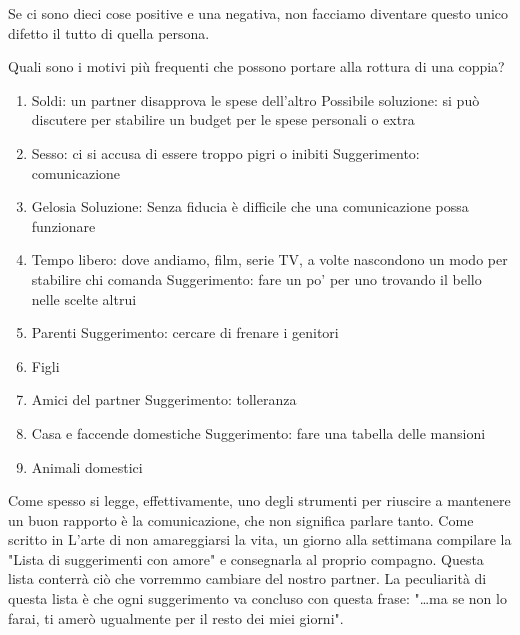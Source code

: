 \documentclass[12pt]{book} %
\begin{document}
Se ci sono dieci cose positive e una negativa, non facciamo diventare questo unico difetto il tutto di quella persona.

Quali sono i motivi più frequenti che possono portare alla rottura di una coppia?

\begin{enumerate}
\item Soldi: un partner disapprova le spese dell'altro\newline
Possibile soluzione: si può discutere per stabilire un budget per le spese personali o extra
\item Sesso: ci si accusa di essere troppo pigri o inibiti \newline
Suggerimento: comunicazione
\item Gelosia\newline
Soluzione: Senza fiducia è difficile che una comunicazione possa funzionare
\item Tempo libero: dove andiamo, film, serie TV, a volte nascondono un modo per stabilire chi comanda \newline
Suggerimento: fare un po' per uno trovando il bello nelle scelte altrui
\item Parenti \newline
Suggerimento: cercare di frenare i genitori
\item Figli
\item Amici del partner \newline
Suggerimento: tolleranza
\item Casa e faccende domestiche \newline
Suggerimento: fare una tabella delle mansioni
\item Animali domestici
\end{enumerate}
Come spesso si legge, effettivamente, uno degli strumenti per riuscire a mantenere un buon rapporto è la comunicazione,
che non significa parlare tanto. Come scritto in L'arte di non amareggiarsi la
vita, un giorno alla settimana compilare la "Lista
di suggerimenti con amore" e consegnarla al proprio compagno. Questa lista conterrà ciò che vorremmo cambiare del nostro partner. La peculiarità di questa lista è che ogni suggerimento va concluso con questa
frase: "…ma se non lo farai, ti amerò ugualmente per il resto dei miei giorni". 
\end{document}
